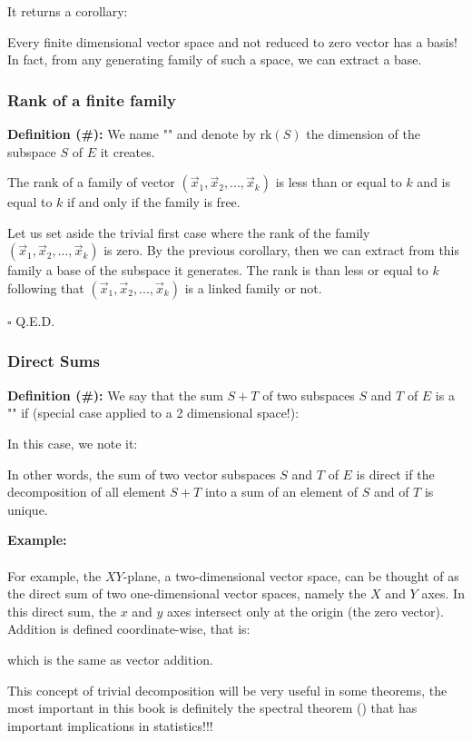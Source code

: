 	It returns a corollary: 

	Every finite dimensional vector space and not reduced to zero vector has a basis! In fact, from any generating family of such a space, we can extract a base.
	
	\subsubsection{Rank of a finite family}
	\textbf{Definition (\#\mydef):} We name "" and denote by $\text{rk}(S)$ the dimension of the subspace $S$ of $E$ it creates.
	
	\begin{theorem}
	The rank of a family of vector $(\vec{x}_1,\vec{x}_2,...,\vec{x}_k)$ is less than or equal to $k$ and is equal to $k$ if and only if the family is free.
	\end{theorem}
	\begin{dem}
	Let us set aside the trivial first case where the rank of the family $(\vec{x}_1,\vec{x}_2,...,\vec{x}_k)$ is zero. By the previous corollary, then we can extract from this family a base of the subspace it generates. The rank is than less or equal to $k$ following that $(\vec{x}_1,\vec{x}_2,...,\vec{x}_k)$ is a linked family or not.
	\begin{flushright}
		$\square$  Q.E.D.
	\end{flushright}
	\end{dem}
	
	\pagebreak
	\subsubsection{Direct Sums}
	\textbf{Definition (\#\mydef):} We say that the sum $S + T$ of two subspaces $S$ and $T$ of $E$ is a "\label{direct sum}" if (special case applied to a 2 dimensional space!):
	
	In this case, we note it:
	
	In other words, the sum of two vector subspaces $S$ and $T$ of $E$ is direct if the decomposition of all element $S + T$ into a sum of an element of $S$ and of $T$  is unique.
	
	\begin{tcolorbox}[colframe=black,colback=white,sharp corners]
	\textbf{{\Large {}}Example:}\\\\
	For example, the $XY$-plane, a two-dimensional vector space, can be thought of as the direct sum of two one-dimensional vector spaces, namely the $X$ and $Y$ axes. In this direct sum, the $x$ and $y$ axes intersect only at the origin (the zero vector). Addition is defined coordinate-wise, that is:
	 
	which is the same as vector addition.
	\end{tcolorbox}	
	This concept of trivial decomposition will be very useful in some theorems, the most important in this book is definitely the spectral theorem () that has important implications in statistics!!!
	

